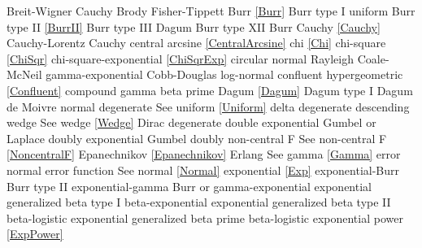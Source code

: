 Breit-Wigner  					\dotfill	Cauchy 							\ncite	%
Brody							\dotfill	Fisher-Tippett						\ncite	%
Burr							\dotfill	\eqref{Burr} 						\ncite	%
Burr	type I					\dotfill	uniform 							\ncite	%
Burr type II					\dotfill	\eqref{BurrII} 						\ncite	%
Burr type III					\dotfill	Dagum							\ncite	%
Burr type XII					\dotfill	Burr 								\ncite	%
%
Cauchy	 						\dotfill	\eqref{Cauchy} 							%
Cauchy-Lorentz 					\dotfill	Cauchy 							\ncite	%
central arcsine 				\dotfill	\eqref{CentralArcsine} 				\ncite	%
chi								\dotfill	\eqref{Chi}						\ncite	%
chi-square						\dotfill	\eqref{ChiSqr}						\ncite	%
chi-square-exponential			\dotfill	\eqref{ChiSqrExp}					\mcite{\self}	%
circular normal					\dotfill	Rayleigh							\ncite %
Coale-McNeil 					\dotfill	gamma-exponential 					     %
Cobb-Douglas					\dotfill	log-normal 						\ncite	%
confluent hypergeometric 		\dotfill	\eqref{Confluent}					\ncite
compound gamma					\dotfill	beta prime							%
%
Dagum 							\dotfill	\eqref{Dagum} 						\ncite	%
Dagum type I 					\dotfill	Dagum							\ncite	%
de Moivre						\dotfill	normal 							\ncite	%
degenerate						\dotfill	See uniform \eqref{Uniform} 			\ncite	%
delta  							\dotfill	degenerate  						\ncite 	%
descending wedge				\dotfill	See wedge \eqref{Wedge} 			\ncite	%
Dirac							\dotfill	degenerate						\ncite	
double exponential 				\dotfill	Gumbel or Laplace 					\ncite	%
doubly exponential				\dotfill	Gumbel							\ncite	%
doubly non-central F       			 \dotfill	See non-central F  \eqref{NoncentralF} 	\ncite 
%
Epanechnikov					\dotfill	\eqref{Epanechnikov}				\ncite
Erlang							\dotfill	See gamma \eqref{Gamma} 			\ncite 	%
error 							\dotfill	normal 							\ncite	%
error function					\dotfill	See normal \eqref{Normal}			\ncite	%
exponential 					\dotfill	\eqref{Exp} 						\ncite	%
exponential-Burr				\dotfill	Burr type II 						\ncite	%
exponential-gamma				\dotfill	Burr 	or gamma-exponential			  		%
exponential generalized beta type I 	\dotfill	beta-exponential					 	%
exponential generalized beta type II 	\dotfill	beta-logistic						 	%
exponential generalized beta prime 	\dotfill	beta-logistic						\ncite	%
exponential power				\dotfill	\eqref{ExpPower}					\ncite

